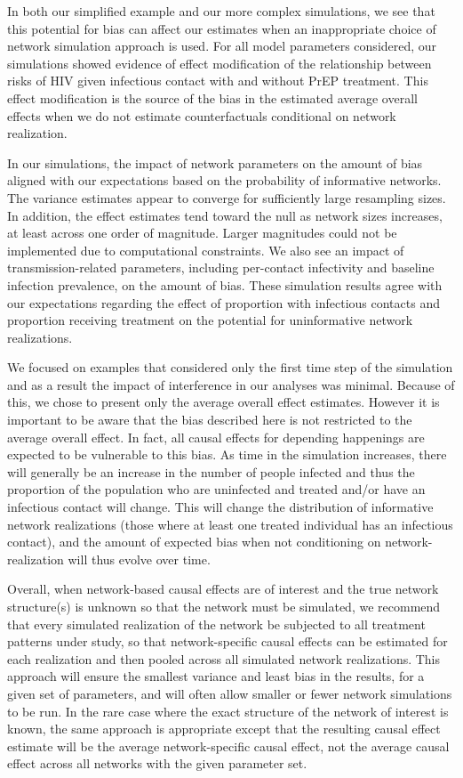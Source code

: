 \documentclass{article}
\theoremstyle{definition}
\begin{document}
 In both our simplified example and our more complex simulations, we see that this potential for bias can affect our estimates when an inappropriate choice of network simulation approach is used.  For all model parameters considered, our simulations showed evidence of effect modification of the relationship between risks of HIV given infectious contact with and without PrEP treatment. This effect modification is the source of the bias in the estimated average overall effects when we do not estimate counterfactuals conditional on network realization. 

 In our simulations, the impact of network parameters on the amount of bias aligned with our expectations based on the probability of informative networks. The variance estimates appear to converge for sufficiently large resampling sizes. In addition, the effect estimates tend toward the null as network sizes increases, at least across one order of magnitude. Larger magnitudes could not be implemented due to computational constraints. We also see an impact of transmission-related parameters, including per-contact infectivity and baseline infection prevalence, on the amount of bias. These simulation results agree with our expectations regarding the effect of proportion with infectious contacts and proportion receiving treatment on the potential for uninformative network realizations. 

We focused on examples that considered only the first time step of the simulation and as a result the impact of interference in our analyses was minimal. Because of this, we chose to present only the average overall effect estimates. However it is important to be aware that the bias described here is not restricted to the average overall effect. In fact, all causal effects for depending happenings are expected to be vulnerable to this bias. As time in the simulation increases, there will generally be an increase in the number of people infected and thus the proportion of the population who are uninfected and treated and/or have an infectious contact will change. This will change the distribution of informative network realizations (those where at least one treated individual has an infectious contact), and the amount of expected bias when not conditioning on network-realization will thus evolve over time. 

Overall, when network-based causal effects are of interest and the true network structure(s) is unknown so that the network must be simulated, we recommend that every simulated realization of the network be subjected to all treatment patterns under study, so that network-specific causal effects can be estimated for each realization and then pooled across all simulated network realizations. This approach will ensure the smallest variance and least bias in the results, for a given set of parameters, and will often allow smaller or fewer network simulations to be run. In the rare case where the exact structure of the network of interest is known, the same approach is appropriate except that the resulting causal effect estimate will be the average network-specific causal effect, not the average causal effect across all networks with the given parameter set.
\end{document}
